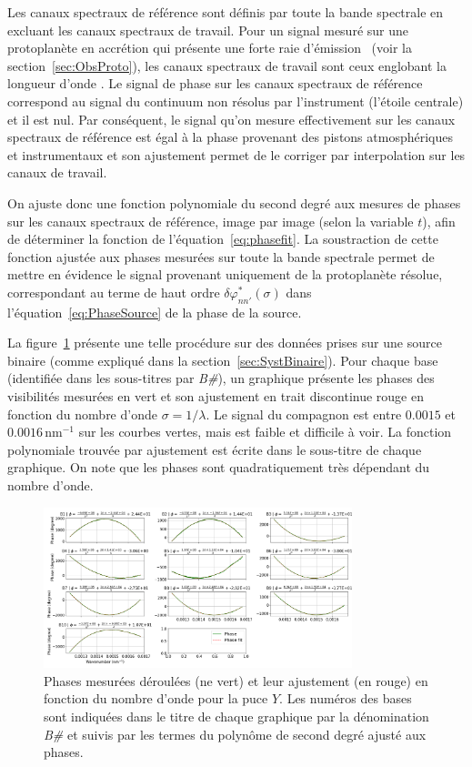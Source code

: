 Les canaux spectraux de référence sont définis par toute la bande spectrale en excluant les canaux spectraux de travail. Pour un signal mesuré sur une protoplanète en accrétion qui présente une forte raie d'émission \ha~(voir la section~\ref{sec:ObsProto}), les canaux spectraux de travail sont ceux englobant la longueur d'onde \ha. Le signal de phase sur les canaux spectraux de référence correspond au signal du continuum non résolus par l'instrument (l'étoile centrale) et il est nul. Par conséquent, le signal qu'on mesure effectivement sur les canaux spectraux de référence est égal à la phase provenant des pistons atmosphériques et instrumentaux et son ajustement permet de le corriger par interpolation sur les canaux de travail.

On ajuste donc une fonction polynomiale du second degré aux mesures de phases sur les canaux spectraux de référence, image par image (selon la variable $t$), afin de déterminer la fonction de l'équation~\ref{eq:phasefit}. La soustraction de cette fonction ajustée aux phases mesurées sur toute la bande spectrale permet de mettre en évidence le signal provenant uniquement de la protoplanète résolue, correspondant au terme de haut ordre $\delta\varphi^{*}_{nn'}(\sigma)$ dans l'équation~\ref{eq:PhaseSource} de la phase de la source.

La figure~\ref{fig:FitPhaseVis} présente une telle procédure sur des données prises sur une source binaire (comme expliqué dans la section~\ref{sec:SystBinaire}). Pour chaque base (identifiée dans les sous-titres par \textit{B\#}), un graphique présente les phases des visibilités mesurées en vert et son ajustement en trait discontinue rouge en fonction du nombre d'onde $\sigma = 1/ \lambda$. Le signal du compagnon est entre $0.0015$ et $0.0016 \, \text{nm}^{-1}$ sur les courbes vertes, mais est faible et difficile à voir. La fonction polynomiale trouvée par ajustement est écrite dans le sous-titre de chaque graphique. On note que les phases sont quadratiquement très dépendant du nombre d'onde.

\begin{figure}[ht!]
    \centering
    \includegraphics[width=0.8\textwidth]{Figure_Chap3/20221010_Bin01_PhaseFit_Pola1_BaseSubplot_LaTex.png}
    \caption[Phases mesurées et ajustées en fonction du nombre d'onde sur la puce $Y$.]{Phases mesurées déroulées (ne vert) et leur ajustement (en rouge) en fonction du nombre d'onde pour la puce $Y$. Les numéros des bases sont indiquées dans le titre de chaque graphique par la dénomination \textit{B\#} et suivis par les termes du polynôme de second degré ajusté aux phases.}
    \label{fig:FitPhaseVis}
\end{figure}

